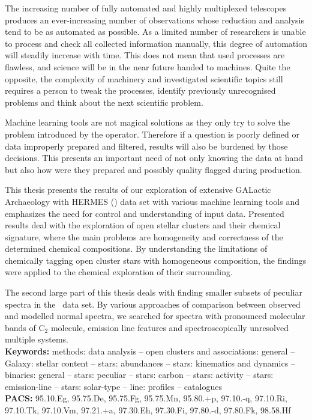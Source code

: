 The increasing number of fully automated and highly multiplexed telescopes produces an ever-increasing number of observations whose reduction and analysis tend to be as automated as possible. As a limited number of researchers is unable to process and check all collected information manually, this degree of automation will steadily increase with time. This does not mean that used processes are flawless, and science will be in the near future handed to machines. Quite the opposite, the complexity of machinery and investigated scientific topics still requires a person to tweak the processes, identify previously unrecognised problems and think about the next scientific problem.

Machine learning tools are not magical solutions as they only try to solve the problem introduced by the operator. Therefore if a question is poorly defined or data improperly prepared and filtered, results will also be burdened by those decisions. This presents an important need of not only knowing the data at hand but also how were they prepared and possibly quality flagged during production.

This thesis presents the results of our exploration of extensive GALactic Archaeology with HERMES (\Gh) data set with various machine learning tools and emphasizes the need for control and understanding of input data. Presented results deal with the exploration of open stellar clusters and their chemical signature, where the main problems are homogeneity and correctness of the determined chemical compositions. By understanding the limitations of chemically tagging open cluster stars with homogeneous composition, the findings were applied to the chemical exploration of their surrounding. 

The second large part of this thesis deals with finding smaller subsets of peculiar spectra in the \Gh\ data set. By various approaches of comparison between observed and modelled normal spectra, we searched for spectra with pronounced molecular bands of C$_2$ molecule, emission line features and spectroscopically unresolved multiple systems.\\[10mm]
{\bf Keywords:} methods: data analysis -- open clusters and associations: general -- Galaxy: stellar content -- stars: abundances -- stars: kinematics and dynamics -- binaries: general -- stars: peculiar -- stars: carbon -- stars: activity -- stars: emission-line -- stars: solar-type -- line: profiles -- catalogues\\[3mm]
{\bf PACS:} 95.10.Eg, 95.75.De, 95.75.Fg, 95.75.Mn, 95.80.+p, 97.10.-q, 97.10.Ri, 97.10.Tk, 97.10.Vm, 97.21.+a, 97.30.Eh, 97.30.Fi, 97.80.-d, 97.80.Fk, 98.58.Hf